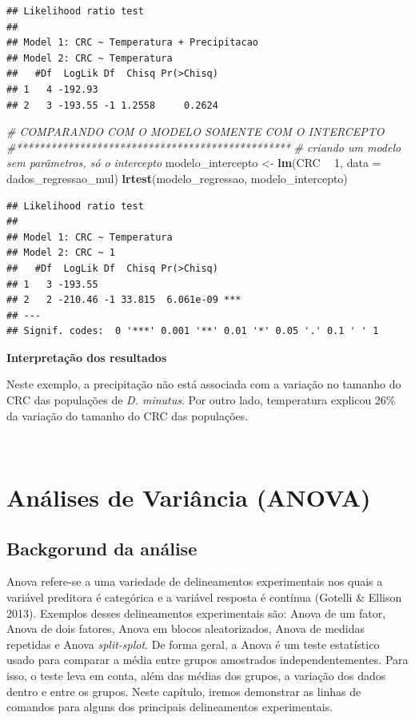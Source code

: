 \documentclass[
]{book}
\newenvironment{Shaded}{\begin{snugshade}}{\end{snugshade}}
\newcommand{\CommentTok}[1]{\textcolor[rgb]{0.56,0.35,0.01}{\textit{#1}}}
\newcommand{\DataTypeTok}[1]{\textcolor[rgb]{0.13,0.29,0.53}{#1}}
\newcommand{\DecValTok}[1]{\textcolor[rgb]{0.00,0.00,0.81}{#1}}
\newcommand{\KeywordTok}[1]{\textcolor[rgb]{0.13,0.29,0.53}{\textbf{#1}}}
\newcommand{\NormalTok}[1]{#1}
\newcommand{\OperatorTok}[1]{\textcolor[rgb]{0.81,0.36,0.00}{\textbf{#1}}}
\newcommand{\StringTok}[1]{\textcolor[rgb]{0.31,0.60,0.02}{#1}}
\begin{document}
\begin{verbatim}
## Likelihood ratio test
## 
## Model 1: CRC ~ Temperatura + Precipitacao
## Model 2: CRC ~ Temperatura
##   #Df  LogLik Df  Chisq Pr(>Chisq)
## 1   4 -192.93                     
## 2   3 -193.55 -1 1.2558     0.2624
\end{verbatim}

\begin{Shaded}
\begin{Highlighting}[]
\CommentTok{# COMPARANDO COM O MODELO SOMENTE COM O INTERCEPTO}
\CommentTok{#************************************************}
\CommentTok{# criando um modelo sem parâmetros, só o intercepto}
\NormalTok{modelo_intercepto <-}\StringTok{ }\KeywordTok{lm}\NormalTok{(CRC }\OperatorTok{~}\StringTok{ }\DecValTok{1}\NormalTok{, }\DataTypeTok{data =}\NormalTok{ dados_regressao_mul)}
\KeywordTok{lrtest}\NormalTok{(modelo_regressao, modelo_intercepto)}
\end{Highlighting}
\end{Shaded}

\begin{verbatim}
## Likelihood ratio test
## 
## Model 1: CRC ~ Temperatura
## Model 2: CRC ~ 1
##   #Df  LogLik Df  Chisq Pr(>Chisq)    
## 1   3 -193.55                         
## 2   2 -210.46 -1 33.815  6.061e-09 ***
## ---
## Signif. codes:  0 '***' 0.001 '**' 0.01 '*' 0.05 '.' 0.1 ' ' 1
\end{verbatim}

\textbf{Interpretação dos resultados}

Neste exemplo, a precipitação não está associada com a variação no tamanho do CRC das populações de \emph{D. minutus}. Por outro lado, temperatura explicou 26\% da variação do tamanho do CRC das populações.

~

\hypertarget{anuxe1lises-de-variuxe2ncia-anova}{%
\section{Análises de Variância (ANOVA)}\label{anuxe1lises-de-variuxe2ncia-anova}}

\hypertarget{backgorund-da-anuxe1lise-5}{%
\subsection{Backgorund da análise}\label{backgorund-da-anuxe1lise-5}}

Anova refere-se a uma variedade de delineamentos experimentais nos quais a variável preditora é categórica e a variável resposta é contínua (Gotelli \& Ellison 2013). Exemplos desses delineamentos experimentais são: Anova de um fator, Anova de dois fatores, Anova em blocos aleatorizados, Anova de medidas repetidas e Anova \emph{split-splot}. De forma geral, a Anova é um teste estatístico usado para comparar a média entre grupos amostrados independentementes. Para isso, o teste leva em conta, além das médias dos grupos, a variação dos dados dentro e entre os grupos. Neste capítulo, iremos demonstrar as linhas de comandos para alguns dos principais delineamentos experimentais.
\end{document}
